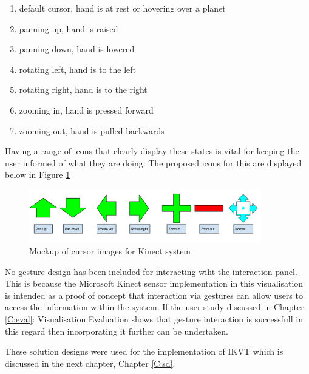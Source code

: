 \begin{enumerate}
\begin{enumerate}
 \item default cursor, hand is at rest or hovering over a planet
 \item panning up, hand is raised
 \item panning down, hand is lowered
 \item rotating left, hand is to the left
 \item rotating right, hand is to the right
 \item zooming in, hand is pressed forward
 \item zooming out, hand is pulled backwards
\end{enumerate}
Having a range of icons that clearly display these states is vital for keeping
the user informed of what they are doing. The proposed icons for this are
displayed below in Figure \ref{fig:cursors}
\begin{figure}[H]
  \centering
      \includegraphics[width=0.9\textwidth]{images/curserImages.png}
  \caption{Mockup of cursor images for Kinect system}  
  \label{fig:cursors}
\end{figure}

No gesture design has been included for interacting wiht the interaction panel.
This is because the Microsoft Kinect sensor implementation in this visualisation
is intended as a proof of concept that interaction via gestures can allow users
to access the information within the system. If the user study discussed in
Chapter \ref{C:eval}: Visualisation Evaluation shows that gesture interaction is
successfull in this regard then incorporating it further can be undertaken.
\end{enumerate}

These solution designs were used for the implementation of IKVT which is discussed in the next chapter, Chapter \ref{C:sd}.
